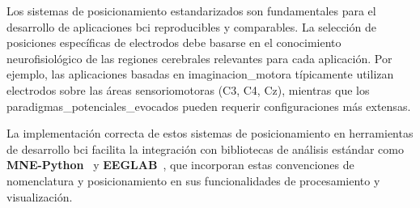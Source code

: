 Los sistemas de posicionamiento estandarizados son fundamentales para el desarrollo de aplicaciones \acrshort{bci} reproducibles y comparables. La selección de posiciones específicas de electrodos debe basarse en el conocimiento neurofisiológico de las regiones cerebrales relevantes para cada aplicación. Por ejemplo, las aplicaciones basadas en \gls{imaginacion_motora} típicamente utilizan electrodos sobre las áreas sensoriomotoras (C3, C4, Cz), mientras que los \gls{paradigmas_potenciales_evocados} pueden requerir configuraciones más extensas.

La implementación correcta de estos sistemas de posicionamiento en herramientas de desarrollo \acrshort{bci} facilita la integración con bibliotecas de análisis estándar como \textbf{MNE-Python}~\cite{gramfort2013meg} y \textbf{EEGLAB}~\cite{delorme2004eeglab}, que incorporan estas convenciones de nomenclatura y posicionamiento en sus funcionalidades de procesamiento y visualización.